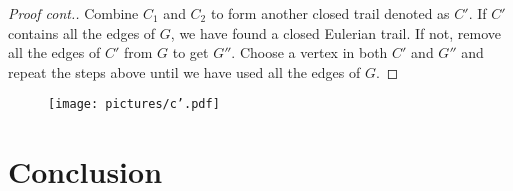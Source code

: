 \documentclass{beamer}
\begin{document}
\begin{frame}[t]
	\begin{proof}[Proof cont.]
		Combine $C_1$ and $C_2$ to form another closed trail denoted as $C'$. If 
		$C'$ contains all the edges of $G$, we have found a closed Eulerian trail. If not, 
		remove all the edges of $C'$ from $G$ to get $G''$. Choose a vertex in both $C'$ and 
		$G''$ and repeat the steps above until we have used all the edges of $G$.
	\end{proof}

	\begin{figure}
		\centering
		\texttt{[image: pictures/c'.pdf]}
	\end{figure}
\end{frame}

\section{Conclusion}

\end{document}
